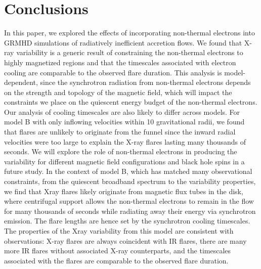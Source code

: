 \section{Conclusions}
In this paper, we explored the effects of incorporating non-thermal electrons into GRMHD simulations of
radiatively inefficient accretion flows. We found that
X-ray variability is a generic result of constraining the
non-thermal electrons to highly magnetized regions and
that the timescales associated with electron cooling are
comparable to the observed flare duration. This analysis is model-dependent, since the synchrotron radiation
from non-thermal electrons depends on the strength and
topology of the magnetic field, which will impact the constraints we place on the quiescent energy budget of the
non-thermal electrons. Our analysis of cooling timescales
are also likely to differ across models. For model B with
only inflowing velocities within 10 gravitational radii, we
found that flares are unlikely to originate from the funnel since the inward radial velocities were too large to
explain the X-ray flares lasting many thousands of seconds. We will explore the role of non-thermal electrons
in producing the variability for different magnetic field
configurations and black hole spins in a future study.
In the context of model B, which has matched many
observational constraints, from the quiescent broadband
spectrum to the variability properties, we find that Xray flares likely originate from magnetic flux tubes in the
disk, where centrifugal support allows the non-thermal
electrons to remain in the flow for many thousands of seconds while radiating away their energy via synchrotron
emission. The flare lengths are hence set by the synchrotron cooling timescales. The properties of the Xray variability from this model are consistent with observations: X-ray flares are always coincident with IR
flares, there are many more IR flares without associated
X-ray counterparts, and the timescales associated with
the flares are comparable to the observed flare duration.
